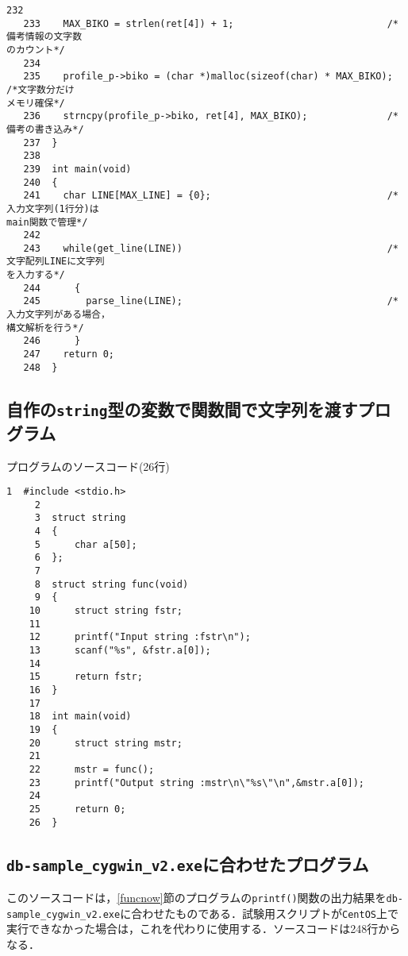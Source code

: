 \begin{Verbatim}[fontsize=\small, baselinestretch=0.8]
   232	
   233	  MAX_BIKO = strlen(ret[4]) + 1;                           /*備考情報の文字数
のカウント*/
   234	
   235	  profile_p->biko = (char *)malloc(sizeof(char) * MAX_BIKO); /*文字数分だけ
メモリ確保*/
   236	  strncpy(profile_p->biko, ret[4], MAX_BIKO);              /*備考の書き込み*/
   237	}
   238	
   239	int main(void)
   240	{
   241	  char LINE[MAX_LINE] = {0};                               /*入力文字列(1行分)は
main関数で管理*/
   242	
   243	  while(get_line(LINE))                                    /*文字配列LINEに文字列
を入力する*/
   244	    {
   245	      parse_line(LINE);                                    /*入力文字列がある場合，
構文解析を行う*/
   246	    }
   247	  return 0;
   248	}
\end{Verbatim}

\subsection{自作の\texttt{string}型の変数で関数間で文字列を渡すプログラム}\label{funcstr}
プログラムのソースコード(26行)
\begin{Verbatim}[fontsize=\small, baselinestretch=0.8]
     1	#include <stdio.h>
     2	
     3	struct string
     4	{
     5		char a[50];
     6	};
     7	
     8	struct string func(void)
     9	{
    10		struct string fstr;
    11	
    12		printf("Input string :fstr\n");
    13		scanf("%s", &fstr.a[0]);
    14	
    15		return fstr;
    16	}
    17	
    18	int main(void)
    19	{
    20		struct string mstr;
    21	
    22		mstr = func();
    23		printf("Output string :mstr\n\"%s\"\n",&mstr.a[0]);
    24	
    25		return 0;
    26	}
\end{Verbatim}

\subsection{\texttt{db-sample\_cygwin\_v2.exe}に合わせたプログラム}\label{funccyg}

このソースコードは，\ref{funcnow}節のプログラムの\verb|printf()|関数の出力結果を\verb|db-sample_cygwin_v2.exe|に合わせたものである．試験用スクリプトが\verb|CentOS|上で実行できなかった場合は，これを代わりに使用する．ソースコードは248行からなる．

